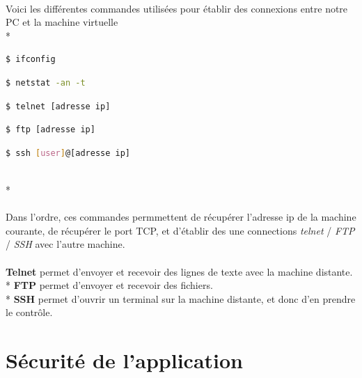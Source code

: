 \documentclass{article}
\begin{document}
\paragraph{}
Voici les diff\'{e}rentes commandes utilis\'{e}es pour \'{e}tablir des connexions entre notre PC et la machine virtuelle \\*
\begin{tcolorbox}
\begin{lstlisting}[language=sh]
$ ifconfig
\end{lstlisting}
\begin{lstlisting}[language=sh]
$ netstat -an -t
\end{lstlisting}
\begin{lstlisting}[language=sh]
$ telnet [adresse ip]
\end{lstlisting}
\begin{lstlisting}[language=sh]
$ ftp [adresse ip]
\end{lstlisting}
\begin{lstlisting}[language=sh]
$ ssh [user]@[adresse ip]
\end{lstlisting}
\end{tcolorbox}
~\\*
\paragraph{}
Dans l'ordre, ces commandes permmettent de r\'{e}cup\'{e}rer l'adresse ip de la machine courante, de r\'{e}cup\'{e}rer le port TCP, et d'\'{e}tablir des une connections \textit{telnet} / \textit{FTP} / \textit{SSH} avec l'autre machine.

\paragraph{}
\textbf{Telnet} permet d'envoyer et recevoir des lignes de texte avec la machine distante. \\*
\textbf{FTP} permet d'envoyer et recevoir des fichiers. \\*
\textbf{SSH} permet d'ouvrir un terminal sur la machine distante, et donc d'en prendre le contrôle.
 

\section{S\'{e}curit\'{e} de l'application}
\end{document}
